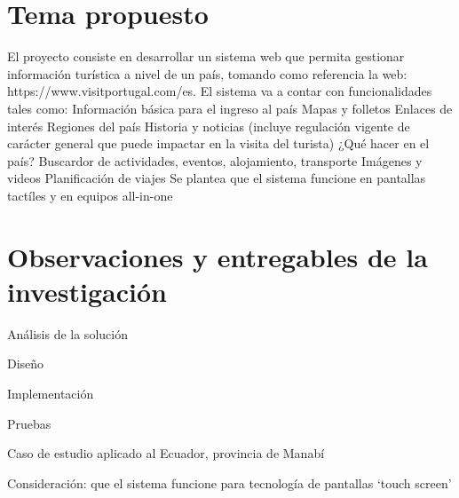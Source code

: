 \documentclass{article}
\begin{document}


\section{Tema propuesto}
    El proyecto consiste en desarrollar un sistema web que permita gestionar información turística a nivel de un país, tomando como referencia la web: https://www.visitportugal.com/es. El sistema va a contar con funcionalidades tales como:
Información básica para el ingreso al país
Mapas y folletos
Enlaces de interés
Regiones del país
Historia y noticias (incluye regulación vigente de carácter general que puede impactar en la visita del turista)
¿Qué hacer en el país?
Buscardor de actividades, eventos, alojamiento, transporte
Imágenes y videos
Planificación de viajes
    Se plantea que el sistema funcione en pantallas tactíles y en equipos all-in-one

\section{Observaciones y entregables de la investigación}

Análisis de la solución

Diseño

Implementación

Pruebas

Caso de estudio aplicado al Ecuador, provincia de Manabí

Consideración: que el sistema funcione para tecnología de pantallas `touch screen'
\end{document}
